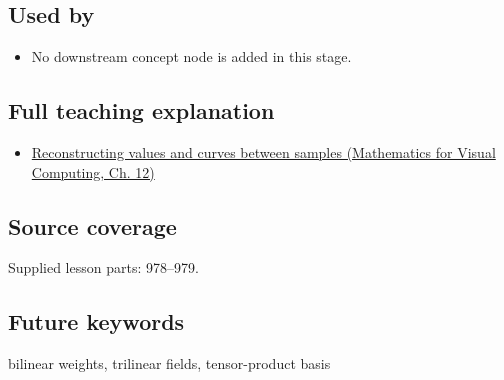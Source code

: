 \subsection{Used by}\label{appendix-0a09b6dfdc86-used-by}

\hypertarget{appendix-0a09b6dfdc86-used-by}{}

\begin{itemize}
\tightlist
\item
  No downstream concept node is added in this stage.
\end{itemize}

\subsection{Full teaching explanation}\label{appendix-0a09b6dfdc86-full-teaching-explanation}

\hypertarget{appendix-0a09b6dfdc86-full-teaching-explanation}{}

\begin{itemize}
\tightlist
\item
  \href{../02-Mathematics-for-Visual-Computing/main.pdf\#nameddest=02-foundations-ii-ch028-reconstructing-values-and-curves-between-samples}{Reconstructing values and curves between samples (Mathematics for Visual Computing, Ch. 12)}
\end{itemize}

\subsection{Source coverage}\label{appendix-0a09b6dfdc86-source-coverage}

\hypertarget{appendix-0a09b6dfdc86-source-coverage}{}

Supplied lesson parts: 978--979.

\subsection{Future keywords}\label{appendix-0a09b6dfdc86-future-keywords}

\hypertarget{appendix-0a09b6dfdc86-future-keywords}{}

bilinear weights, trilinear fields, tensor-product basis
